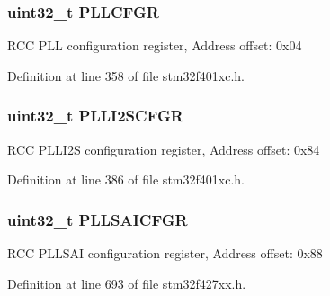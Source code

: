 \subsubsection[{\texorpdfstring{P\+L\+L\+C\+F\+GR}{PLLCFGR}}]{ uint32\+\_\+t P\+L\+L\+C\+F\+GR}\hypertarget{struct_r_c_c___type_def_ae6ff257862eba6b4b367feea786bf1fd}{}\label{struct_r_c_c___type_def_ae6ff257862eba6b4b367feea786bf1fd}
R\+CC P\+LL configuration register, Address offset\+: 0x04 

Definition at line 358 of file stm32f401xc.\+h.

\subsubsection[{\texorpdfstring{P\+L\+L\+I2\+S\+C\+F\+GR}{PLLI2SCFGR}}]{ uint32\+\_\+t P\+L\+L\+I2\+S\+C\+F\+GR}\hypertarget{struct_r_c_c___type_def_a2d08d5f995ed77228eb56741184a1bb6}{}\label{struct_r_c_c___type_def_a2d08d5f995ed77228eb56741184a1bb6}
R\+CC P\+L\+L\+I2S configuration register, Address offset\+: 0x84 

Definition at line 386 of file stm32f401xc.\+h.

\subsubsection[{\texorpdfstring{P\+L\+L\+S\+A\+I\+C\+F\+GR}{PLLSAICFGR}}]{ uint32\+\_\+t P\+L\+L\+S\+A\+I\+C\+F\+GR}\hypertarget{struct_r_c_c___type_def_ac93962b2d41007abdda922a3f23d7ede}{}\label{struct_r_c_c___type_def_ac93962b2d41007abdda922a3f23d7ede}
R\+CC P\+L\+L\+S\+AI configuration register, Address offset\+: 0x88 

Definition at line 693 of file stm32f427xx.\+h.

